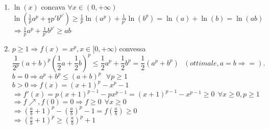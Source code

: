 \documentclass[12px]{article}
\begin{document}
	\begin{dimo}
		\begin{enumerate}
			\item $\ln(x)$ concava $\forall x\in (0,+\infty)$\\
				$\ln(\frac 1pa^p + \frac_1{p'}b^{p'})\geq \frac 1p \ln(a^p) + \frac 1{p'}\ln(b^p) = \ln(a)+\ln(b) = \ln(ab)$\\
				$ \Rightarrow  \frac 1p a^p + \frac 1{p'}b^{p'}\geq ab$ 
			\item $p\geq 1 \Rightarrow f(x) = x^p, x\in[0,+\infty)$ convessa\\
				\[
					\frac{1}{2^p}(a+b)^p(\frac 12 a + \frac 12 b)^p\leq \frac 12 a^p + \frac 12 b^p = \frac 12 (a^p + b^p)\ \ \ (ottimale, a= b \Rightarrow  =)
				.\] 
				$b=0 \Rightarrow  a^p + b^p\leq (a+b)^p \ \ \ \forall p\geq 1$ \\
				$b > 0 \Rightarrow  f(x) = (x+1)^p - x^p -1$ \\
				$ \Rightarrow  f'(x) = p(x+1)^{p-1}-px^{p-1} = (x+1)^{p-1}-x^{p-1}\geq 0\ \ \forall x\geq 0, p\geq 1$ \\
				$ \Rightarrow f \nearrow, f(0)= 0 \Rightarrow f\geq 0\ \ \forall x\geq 0$ \\
			$ \Rightarrow  (\frac ab + 1)^p-(\frac ab)^p-1 = f(\frac ab) \geq 0$ \\
		$ \Rightarrow  (\frac ab + 1)^p \geq (\frac ab)^p + 1$
		\end{enumerate}
	\end{dimo}
\end{document}
